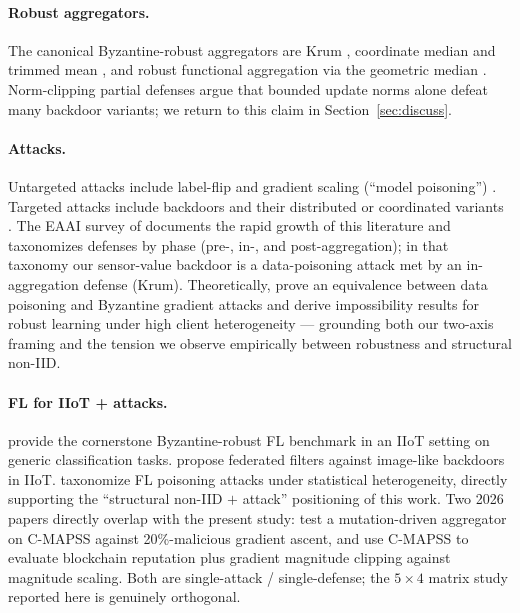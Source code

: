 \documentclass[a4paper,fleqn,doubleblind]{cas-sc}
\begin{document}
\paragraph{Robust aggregators.}
The canonical Byzantine-robust aggregators are Krum
\citep{Blanchard2017Krum}, coordinate median and trimmed mean
\citep{Yin2018RobustDistributed}, and robust functional
aggregation via the geometric median \citep{Pillutla2022RFA}.
Norm-clipping partial defenses \citep{Sun2019CanYouBackdoor}
argue that bounded update norms alone defeat many backdoor
variants; we return to this claim in Section~\ref{sec:discuss}.

\paragraph{Attacks.}
Untargeted attacks include label-flip and gradient scaling
(``model poisoning'')
\citep{Bhagoji2019AdversarialLens, Fang2020LocalPoisoning}.
Targeted attacks include backdoors
\citep{Bagdasaryan2020BackdoorFL} and their distributed or
coordinated variants \citep{Xie2020DBA, Lyu2025CoBA}. The
EAAI survey of \citet{Nguyen2024BackdoorSurvey} documents the rapid
growth of this literature and taxonomizes defenses by phase
(pre-, in-, and post-aggregation); in that taxonomy our sensor-value
backdoor is a data-poisoning attack met by an in-aggregation defense
(Krum). Theoretically, \citet{Farhadkhani2022Equivalence} prove an
equivalence between data poisoning and Byzantine gradient attacks and
derive impossibility results for robust learning under high client
heterogeneity --- grounding both our two-axis framing and the tension
we observe empirically between robustness and structural non-IID.

\paragraph{FL for {IIoT} + attacks.}
\citet{Li2023ByzantineFLIIoT} provide the cornerstone
Byzantine-robust FL benchmark in an IIoT setting on generic
classification tasks. \citet{Hou2022FederatedFiltersIIoT}
propose federated filters against image-like backdoors in IIoT.
\citet{Djemaa2026HeterogeneityPoisoning} taxonomize FL poisoning
attacks under statistical heterogeneity, directly supporting the
``structural non-IID $+$ attack'' positioning of this work. Two
2026 papers directly overlap with the present study:
\citet{Tallat2026BioMutFedPlus} test a mutation-driven aggregator
on C-MAPSS against 20\%-malicious gradient ascent, and
\citet{Li2026TrustworthyFLIIoT} use C-MAPSS to evaluate
blockchain reputation plus gradient magnitude clipping against
magnitude scaling. Both are single-attack / single-defense; the
$5 \times 4$ matrix study reported here is genuinely orthogonal.
\end{document}
